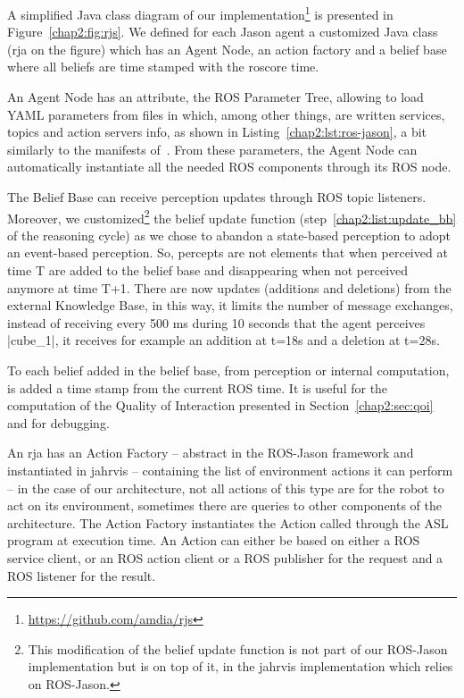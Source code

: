 \documentclass[a4paper,11pt,twoside]{StyleThese}
\begin{document}
A simplified Java class diagram of our  implementation\footnote{\url{https://github.com/amdia/rjs}} is presented in Figure~\ref{chap2:fig:rjs}. We defined for each Jason agent a customized Java class (\acrfull{rja} on the figure) which has an Agent Node, an action factory and a belief base where all beliefs are time stamped with the roscore time. 

An Agent Node has an attribute, the ROS Parameter Tree, allowing to load YAML parameters from files in which, among other things, are written services, topics and action servers info, as shown in Listing~\ref{chap2:lst:ros-jason}, a bit similarly to the manifests of~\cite{silva_2020_embedded}. From these parameters, the Agent Node can automatically instantiate all the needed ROS components through its ROS node. 

The Belief Base can receive perception updates through ROS topic listeners. Moreover, we customized\footnote{This modification of the belief update function is not part of our ROS-Jason implementation but is on top of it, in the \acrshort{jahrvis} implementation which relies on ROS-Jason.} the belief update function (step~\ref{chap2:list:update_bb} of the reasoning cycle) as we chose to abandon a state-based perception to adopt an event-based perception. So, percepts are not elements that when perceived at time T are added to the belief base and disappearing when not perceived anymore at time T+1. There are now updates (additions and deletions) from the external Knowledge Base, in this way, it limits the number of message exchanges, \ie instead of receiving every 500 ms during 10 seconds that the agent perceives |cube_1|, it receives for example an addition at t=18s and a deletion at t=28s. 

To each belief added in the belief base, from perception or internal computation, is added a time stamp from the current ROS time. It is useful for the computation of the Quality of Interaction presented in Section~\ref{chap2:sec:qoi} and for debugging.

An \acrshort{rja} has an Action Factory -- abstract in the ROS-Jason framework and instantiated in \acrshort{jahrvis} -- containing the list of environment actions it can perform -- in the case of our architecture, not all actions of this type are for the robot to act on its environment, sometimes there are queries to other components of the architecture. The Action Factory instantiates the Action called through the ASL program at execution time. An Action can either be based on either a ROS service client, or an ROS action client or a ROS publisher for the request and a ROS listener for the result. 
\end{document}
